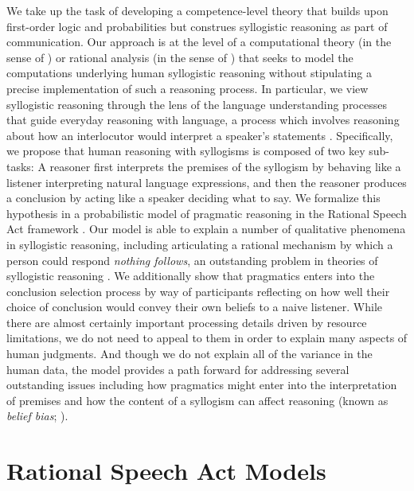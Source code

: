 \documentclass[floatsintext, man]{apa6}
\begin{document}
We take up the task of developing a competence-level theory that builds upon first-order logic and probabilities but construes syllogistic reasoning as part of communication. 
Our approach is at the level of a computational theory (in the sense of ) or rational analysis (in the sense of ) that seeks to model the computations underlying human syllogistic reasoning without stipulating a precise implementation of such a reasoning process. 
In particular, we view syllogistic reasoning through the lens of the language understanding processes that guide everyday reasoning with language, a process which involves reasoning about how an interlocutor would interpret a speaker's statements \cite{Grice1975, Clark1996, Levinson2000}. 
Specifically, we propose that human reasoning with syllogisms is composed of two key sub-tasks: A reasoner first interprets the premises of the syllogism by behaving like a listener interpreting natural language expressions, and then the reasoner produces a conclusion by acting like a speaker deciding what to say.
We formalize this hypothesis in a probabilistic model of pragmatic reasoning in the Rational Speech Act framework \cite{Frank2012a, goodman2016pragmatic, scontras2018probabilistic}.
Our model is able to explain a number of qualitative phenomena in syllogistic reasoning, including articulating a rational mechanism by which a person could respond \emph{nothing follows}, an outstanding problem in theories of syllogistic reasoning \cite{riesterer2020modeling}.
We additionally show that pragmatics enters into the conclusion selection process by way of participants reflecting on how well their choice of conclusion would convey their own beliefs to a naive listener. 
While there are almost certainly important processing details driven by resource limitations, we do not need to appeal to them in order to explain many aspects of human judgments.
And though we do not explain all of the variance in the human data, the model provides a path forward for addressing several outstanding issues including how pragmatics might enter into the interpretation of premises and  how the content of a syllogism can affect reasoning (known as \emph{belief bias}; ).


\section{Rational Speech Act Models}
\end{document}
